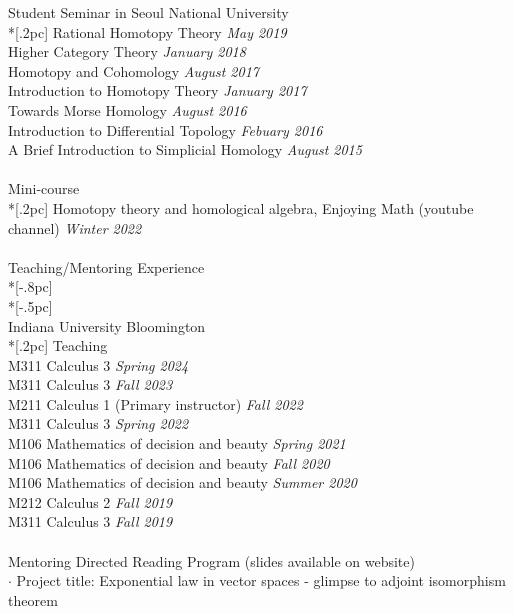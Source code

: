 \documentclass{article}
\begin{document}
{ \large Student Seminar in Seoul National University}\\*[.2pc] 
{Rational Homotopy Theory } \hfill {\it May 2019\/} \\
{Higher Category Theory} \hfill {\it January 2018\/} \\
{Homotopy and Cohomology } \hfill {\it August 2017\/} \\
{Introduction to Homotopy Theory } \hfill {\it January 2017\/} \\
{Towards Morse Homology } \hfill {\it August 2016\/} \\
{Introduction to Differential Topology } \hfill {\it Febuary 2016\/} \\
{A Brief Introduction to Simplicial Homology } \hfill {\it August 2015\/} \\
\\
{ \large Mini-course} \\*[.2pc]
{Homotopy theory and homological algebra, Enjoying Math (youtube channel)} \hfill {\it Winter 2022\/} \\
\\
{\Large  Teaching/Mentoring Experience} \\*[-.8pc]
\underline{\hspace{6.5in}} \\*[-.5pc]
\\
{ \large Indiana University Bloomington}  \\*[.2pc]
{ Teaching} \\
M311 Calculus 3  \hfill {\it Spring 2024 \/}\\
M311 Calculus 3  \hfill {\it Fall 2023 \/}\\
M211 Calculus 1 (Primary instructor)   \hfill {\it Fall 2022 \/}\\
M311 Calculus 3  \hfill {\it Spring 2022 \/}\\
M106 Mathematics of decision and beauty \hfill {\it Spring 2021}\\
M106 Mathematics of decision and beauty \hfill {\it Fall 2020}\\
M106 Mathematics of decision and beauty \hfill {\it Summer 2020}\\
M212 Calculus 2  \hfill {\it Fall 2019 \/}\\
M311 Calculus 3  \hfill {\it Fall 2019 \/}\\ \\
{ Mentoring Directed Reading Program} (slides available on website) \\
$\cdot$ Project title: Exponential law in vector spaces - glimpse to adjoint isomorphism theorem
\end{document}
